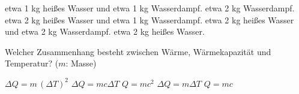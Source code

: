 \documentclass[11pt]{exam}
\begin{document}
\begin{questions}
\begin{choices}
	\choice etwa 1 kg heißes Wasser und etwa 1 kg Wasserdampf.
	\choice etwa 2 kg Wasserdampf.
	\choice etwa 2 kg heißes Wasser und etwa 1 kg Wasserdampf.
	\choice etwa 2 kg heißes Wasser und etwa 2 kg Wasserdampf.
	\choice etwa 2 kg heißes Wasser.
\end{choices}

\vspace{3mm}\question Welcher Zusammenhang besteht zwischen Wärme, Wärmekapazität und Temperatur? (\(m\): Masse)

\begin{choices}
	\choice \(\Delta Q = m \, (\Delta T)^2\)
	\choice \(\Delta Q = m c \Delta T\)
	\choice \(Q = m c^2\)
	\choice \(\Delta Q = m \Delta T\)
	\choice \(Q = m c\)
\end{choices}

\vspace{3mm}\end{questions}
\end{document}
